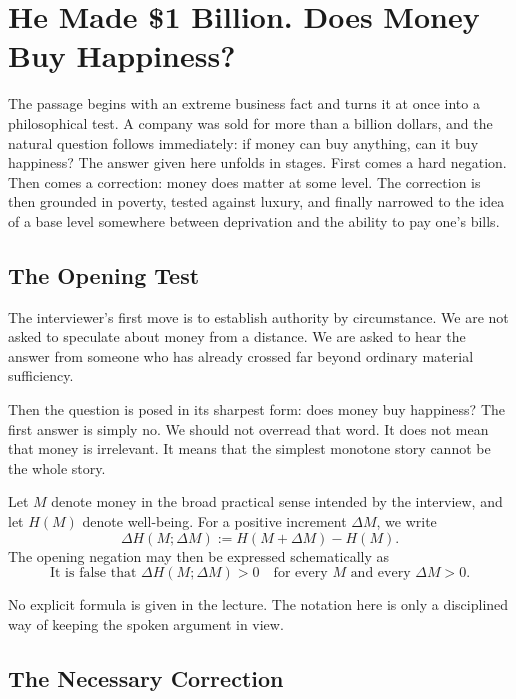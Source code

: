 \chapter{He Made \$1 Billion. Does Money Buy Happiness?}

The passage begins with an extreme business fact and turns it at once into a philosophical test. A company was sold for more than a billion dollars, and the natural question follows immediately: if money can buy anything, can it buy happiness? The answer given here unfolds in stages. First comes a hard negation. Then comes a correction: money does matter at some level. The correction is then grounded in poverty, tested against luxury, and finally narrowed to the idea of a base level somewhere between deprivation and the ability to pay one’s bills.

\section{The Opening Test}

The interviewer’s first move is to establish authority by circumstance. We are not asked to speculate about money from a distance. We are asked to hear the answer from someone who has already crossed far beyond ordinary material sufficiency.

Then the question is posed in its sharpest form: does money buy happiness? The first answer is simply no. We should not overread that word. It does not mean that money is irrelevant. It means that the simplest monotone story cannot be the whole story.

Let \(M\) denote money in the broad practical sense intended by the interview, and let \(H(M)\) denote well-being. For a positive increment \(\Delta M\), we write
\begin{equation}
\Delta H(M;\Delta M):=H(M+\Delta M)-H(M).
\end{equation}
The opening negation may then be expressed schematically as
\begin{equation}
\text{It is false that } \Delta H(M;\Delta M)>0
\quad
\text{for every } M \text{ and every } \Delta M>0.
\end{equation}

\begin{remark}
No explicit formula is given in the lecture. The notation here is only a disciplined way of keeping the spoken argument in view.
\end{remark}

\section{The Necessary Correction}

